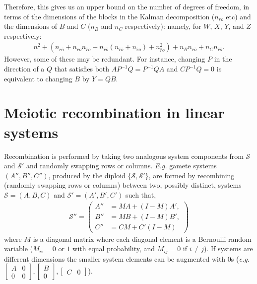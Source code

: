\documentclass{article}
\newcommand{\ro}{{ro}}
\newcommand{\nro}{{\bar{r}o}}
\newcommand{\rno}{{r\bar{o}}}
\newcommand{\nrno}{{\bar{r}\bar{o}}}
\newcommand{\1}{\mathbbm{1}}
\newcommand{\Sys}{\mathcal{S}}
\begin{document}
Therefore, this gives us an upper bound on the number of degrees of freedom,
in terms of the dimensions of the blocks in the Kalman decomposition ($n_\ro$ etc)
and the dimensions of $B$ and $C$ ($n_B$ and $n_C$ respectively):
namely, for $W$, $X$, $Y$, and $Z$ respectively:
$$\begin{aligned}
    n^2 
    + (n_{\rno} + n_\ro n_\nro + n_\nrno(n_\nrno + n_\nro) + n_\nro^2)
    + n_B n_\rno
    + n_C n_\nrno .
\end{aligned}$$
However, some of these may be redundant.
For instance, changing $P$ in the direction of 
a $Q$ that satisfies both $A P^{-1} Q = P^{-1} Q A$ and $C P^{-1} Q = 0$
is equivalent to changing $B$ by $Y = QB$.

\section{Meiotic recombination in linear systems}\label{apx:recombination}

  Recombination is performed by taking two analogous system components from $\Sys$ and $\Sys'$ and randomly swapping rows or columns.
  \emph{E.g.} gamete systems $(A'', B'', C'')$, produced by the diploid $\{\Sys, \Sys'\}$, are formed by recombining (randomly swapping rows or columns) between two, possibly distinct, systems $\Sys = (A,B,C)$ and $\Sys' = (A', B', C')$ such that,
  \begin{align*}
    \Sys'' = \left( \begin{array}{ll}
    A'' &= MA + (I-M)A' , \\
    B'' &= MB + (I-M)B' , \\
    C'' &= CM + C'(I-M)
    \end{array} \right)
  \end{align*}
  where $M$ is a diagonal matrix where each diagonal element is a Bernoulli random variable ($M_{ii} = 0$ or $1$ with equal probability, and $M_{ij}=0$ if $i \neq j$). If systems are different dimensions the smaller system elements can be augmented with $0$s (\emph{e.g.} $\left[ \begin{smallmatrix} A & 0 \\ 0 & 0 \end{smallmatrix} \right], \left[ \begin{smallmatrix} B \\ 0 \end{smallmatrix} \right], \left[ \begin{smallmatrix} C & 0 \end{smallmatrix}\right]$).
\end{document}
